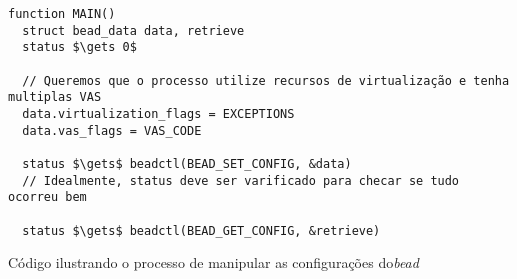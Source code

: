 \begin{pseudocode}

\begin{lstlisting}[language=pseudocode, style=pseudocode]
function MAIN()
  struct bead_data data, retrieve
  status $\gets 0$

  // Queremos que o processo utilize recursos de virtualização e tenha multiplas VAS
  data.virtualization_flags = EXCEPTIONS
  data.vas_flags = VAS_CODE

  status $\gets$ beadctl(BEAD_SET_CONFIG, &data)
  // Idealmente, status deve ser varificado para checar se tudo ocorreu bem

  status $\gets$ beadctl(BEAD_GET_CONFIG, &retrieve)

\end{lstlisting}

  \caption{Código ilustrando o processo de manipular as configurações  do\emph{bead}}
  \label{alg:exconfig}
\end{pseudocode}
